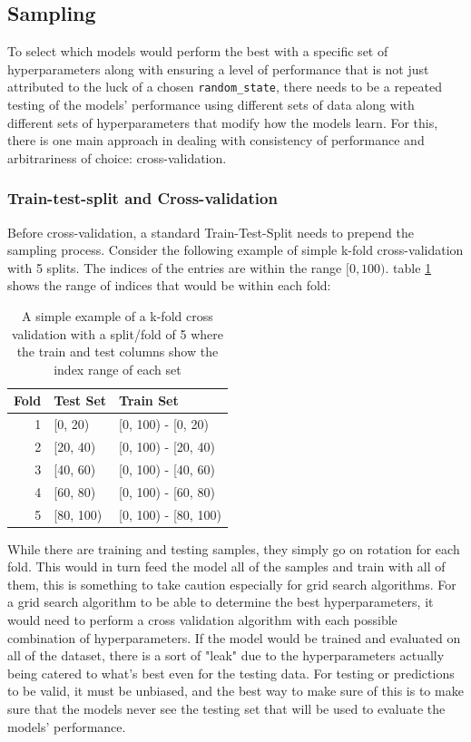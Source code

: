 \subsection{Sampling}

To select which models would perform the best with a specific set of hyperparameters along with ensuring a level of performance that is not just attributed to the luck of a chosen \texttt{random\_state}, there needs to be a repeated testing of the models' performance using different sets of data along with different sets of hyperparameters that modify how the models learn. For this, there is one main approach in dealing with consistency of performance and arbitrariness of choice: cross-validation.

\subsubsection{Train-test-split and Cross-validation}

Before cross-validation, a standard Train-Test-Split needs to prepend the sampling process. Consider the following example of simple k-fold cross-validation with 5 splits. The indices of the entries are within the range $[0, 100)$. table \ref{tab:kfold} shows the range of indices that would be within each fold:

\begin{table}[H]
    \caption{A simple example of a k-fold cross validation with a split/fold of 5 where the train and test columns show the index range of each set}
    \label{tab:kfold}
    \begin{tabularx}{\linewidth}{r|>{\centering}X>{\centering\arraybackslash}X}
        \toprule
        Fold & Test Set & Train Set\\
        \midrule
        1 & [0, 20) & [0, 100) - [0, 20)\\
        2 & [20, 40) & [0, 100) - [20, 40)\\
        3 & [40, 60) & [0, 100) - [40, 60)\\
        4 & [60, 80) & [0, 100) - [60, 80)\\
        5 & [80, 100) & [0, 100) - [80, 100)\\
        \bottomrule
    \end{tabularx}
\end{table}

While there are training and testing samples, they simply go on rotation for each fold. This would in turn feed the model all of the samples and train with all of them, this is something to take caution especially for grid search algorithms. For a grid search algorithm to be able to determine the best hyperparameters, it would need to perform a cross validation algorithm with each possible combination of hyperparameters. If the model would be trained and evaluated on all of the dataset, there is a sort of "leak" due to the hyperparameters actually being catered to what's best even for the testing data. For testing or predictions to be valid, it must be unbiased, and the best way to make sure of this is to make sure that the models never see the testing set that will be used to evaluate the models' performance. 

